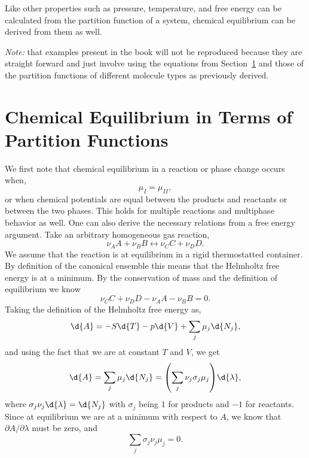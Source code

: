 Like other properties such as pressure, temperature, and free energy can be
calculated from the partition function of a system, chemical equilibrium can be
derived from them as well.

\textit{Note: }that examples present in the book will not be reproduced because
they are straight forward and just involve using the equations from
Section~\ref{sec:chemeqetpf} and those of the partition functions of different
molecule types as previously derived.

\section{Chemical Equilibrium in Terms of Partition Functions}%
\label{sec:chemeqetpf}
We first note that chemical equilibrium in a reaction or phase change occurs
when,
\begin{equation*}
	\mu_I = \mu_{II},
\end{equation*}
or when chemical potentials are equal between the products and reactants or
between the two phases. This holds for multiple reactions and multiphase
behavior as well. One can also derive the necessary relations from a free energy
argument. Take an arbitrary homogeneous gas reaction,
\begin{equation*}
	\nu_A A + \nu_B B \leftrightarrow \nu_C C + \nu_D D.
\end{equation*}
We assume that the reaction is at equilibrium in a rigid thermostatted
container. By definition of the canonical ensemble this means that the Helmholtz
free energy is at a minimum. By the conservation of mass and the definition of
equilibrium we know
\begin{equation*}
	\nu_C C + \nu_D D - \nu_A A - \nu_B B = 0.
\end{equation*}
Taking the definition of the Helmholtz free energy as,
\begin{equation*}
	\d{A} = -S\d{T} - p\d{V} + \sum_{j}{\mu_j \d{N_{j}}},
\end{equation*}
and using the fact that we are at constant $T$ and $V$, we get
\begin{equation*}
	\d{A} = \sum_{j}{\mu_j \d{N_{j}}} = {\left(\sum_{j}{\nu_j \sigma_j
	\mu_{j}}\right)}\d{\lambda},
\end{equation*}
where $\sigma_j \nu_j \d{\lambda} = \d{N_{j}}$ with $\sigma_j$ being $1$
for products and $-1$ for reactants. Since at equilibrium we are at a
minimum with respect to $A$, we know that $\partial A/ \partial \lambda$ must be
zero, and
\begin{equation*}
	\sum_{j}{\sigma_j \nu_j \mu_j} = 0.
\end{equation*}
